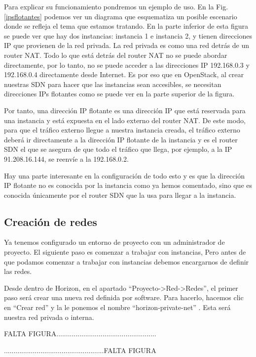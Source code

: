 Para explicar su funcionamiento pondremos un ejemplo de uso. En la Fig.\ref{ipsflotantes} podemos ver un diagrama que esquematiza un posible escenario donde se refleja el tema que estamos tratando. En la parte inferior de esta figura se puede ver que hay dos instancias: instancia 1 e instancia 2, y tienen direcciones IP que provienen de la red privada. La red privada es como una red detrás de un router NAT. Todo lo que está detrás del router NAT no se puede abordar directamente, por lo tanto, no se puede acceder a las direcciones IP 192.168.0.3 y 192.168.0.4 directamente desde Internet. Es por eso que en OpenStack, al crear nuestras SDN para hacer que las instancias sean accesibles, se necesitan direcciones IPs flotantes como se puede ver en la parte superior de la figura.\cite{noauthor_floating_2012}

Por tanto, una dirección IP flotante  es una dirección IP que está reservada para una instancia y está expuesta en el lado externo del router NAT. De este modo, para que el tráfico externo llegue a nuestra instancia creada, el tráfico externo deberá ir directamente a la dirección IP flotante de la instancia y es el router SDN el que se asegura de que todo el tráfico que llega, por ejemplo, a la IP 91.208.16.144, se reenvíe a la 192.168.0.2.

Hay una parte interesante en la configuración de todo esto y es que la dirección IP flotante no es conocida por la instancia como ya hemos comentado, sino que es conocida únicamente por el router SDN que la usa para llegar a la instancia. 

\subsection{Creación de redes}
Ya tenemos configurado un entorno de proyecto con un administrador de proyecto. El siguiente paso es comenzar a trabajar con instancias, Pero antes de que podamos comenzar a trabajar con instancias debemos encargarnos de definir las redes.

Desde dentro de Horizon, en el apartado  “Proyecto-\textgreater Red-\textgreater Redes”, el primer paso será crear una nueva red definida por software. Para hacerlo, hacemos clic en “Crear red” y la le ponemos el nombre “horizon-private-net” %
. Esta será nuestra red privada o interna.

\begin{tcolorbox}[colback=green!5!white,colframe=green!75!black]
FALTA FIGURA....................................................

....................................................FALTA FIGURA
\end{tcolorbox}

